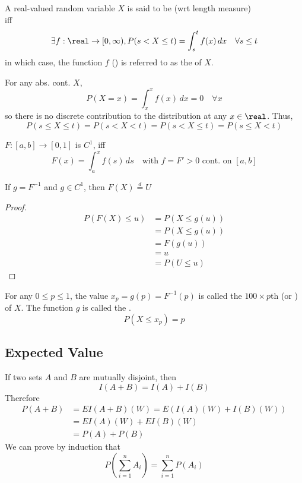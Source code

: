 \documentclass[11pt]{article}
\numberwithin{equation}{section}
\begin{document}
A real-valued random variable $X$ is said to be  (wrt length measure)\\
iff\\
\begin{equation}
	\exists f: \real \rightarrow [0, \infty), P(s < X \leq t) = \int_s^t f(x)\,dx \quad \forall s \leq t
\end{equation}
in which case, the function $f$ () is referred to as the  of $X$.

\remark
For any abs. cont. $X$, 
\begin{equation}
	P(X = x) = \int_x^x f(x) \, dx = 0 \quad \forall x
\end{equation}
so there is no discrete contribution to the distribution at any $x \in \real$.
Thus,
$$P(s \leq X \leq t) = P(s < X < t) = P(s < X \leq t) = P(s \leq X < t)$$

\proposition
$F: [a,b] \rightarrow [0, 1]$ is $C^1$, iff
$$F(x) = \int_a^x f(s) \, ds \quad \text{with } f = F' > 0 \text{ cont. on } [a, b]$$ 

\proposition If $g = F^{-1}$ and $g \in C^1$, then $F(X) \overset{d}{=} U$
\begin{proof}
	\begin{align}
		P(F(X) \leq u) &= P(X \leq g(u)) \\
		&= P(X \leq g(u)) \\
		&= F(g(u)) \\
		&= u \\
		&= P(U \leq u)
	\end{align}
\end{proof}

For any $0 \leq p \leq 1$, the value $x_p = g(p) = F^{-1}(p)$ is called the $100 \times p$th  (or ) of $X$. The function $g$ is called the .
\begin{equation}
	P(X \leq x_p) = p
\end{equation}

\subsection{Expected Value}
If two sets $A$ and $B$ are mutually disjoint, then
\begin{equation}
	I(A + B) = I(A) + I(B)
\end{equation}
Therefore
\begin{align}
	P(A+B) &= EI(A + B)(W) = E(I(A)(W) + I(B)(W)) \\
	&= EI(A)(W) + EI(B)(W) \\
	&= P(A) + P(B)	
\end{align}
We can prove by induction that
\begin{equation}
	P\left(\sum_{i=1}^n A_i \right) = \sum_{i=1}^n P(A_i)
\end{equation}
\end{document}
